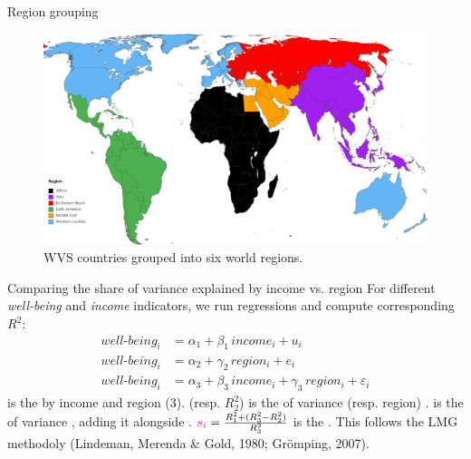 \documentclass[aspectratio=169,xcolor=dvipsnames, 11pt,mathserif]{beamer}
\begin{document}
\begin{frame}{Region grouping}
    \begin{figure}
        \caption{WVS countries grouped into six world regions.}  
        \centering \includegraphics[height=.8\textheight]{../figures/region_groupings} %
    \end{figure}
\end{frame}

\begin{frame}{Comparing the share of variance explained by income vs. region}
    \bbvsp
    \ip For different \textit{well-being} and \textit{income} indicators, we run regressions and compute corresponding $R^2$:
    \begin{align} 
        well\text{-}being_i &= \alpha_1 + \beta_1\, income_i + u_i\\
        well\text{-}being_i &= \alpha_2 + \gamma_2\, region_i + e_i\\
        well\text{-}being_i &= \alpha_3 + \beta_3\, income_i + \gamma_3\, region_i + \varepsilon_i 
    \end{align}
    \ip {} is the  by income and region (3).
    \ip {} (resp. $R^2_2$) is the  of variance  (resp. region) .
    \ip {} is the  of variance ,  adding it alongside . %
    \ip $\textcolor{magenta}{s_i} = \frac{R^2_1 + (R^2_3-R^2_2)}{R^2_3}$ is the .
    \ip This follows the LMG methodoly (Lindeman, Merenda \& Gold, 1980; Grömping, 2007).
    \ee
\end{frame}
              
\end{document}
